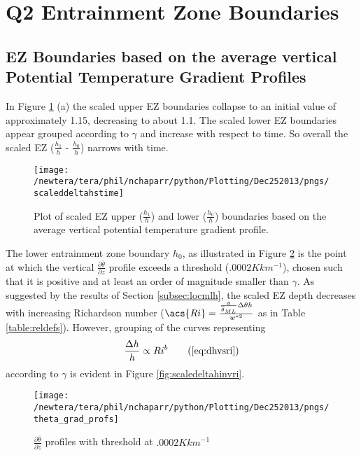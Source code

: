 
\section{Q2 Entrainment Zone Boundaries}
\label{sec:deltahri}
\FloatBarrier
\subsection{\acs{EZ} Boundaries based on the average vertical Potential Temperature Gradient Profiles}
In Figure \ref{fig:scaledEZlims} (a) the scaled upper \acs{EZ} boundaries collapse to an initial value of approximately 1.15, decreasing to about 1.1.  The scaled lower \acs{EZ} boundaries appear grouped according to $\gamma$ and increase with respect to time.  So overall the scaled \acs{EZ} ($\frac{h_{1}}{h}$ - $\frac{h_{0}}{h}$) narrows with time.\\

\begin{figure}[htbp]
    \centering
    \texttt{[image: /newtera/tera/phil/nchaparr/python/Plotting/Dec252013/pngs/scaleddeltahstime]}
    \caption{Plot of scaled \acs{EZ} upper ($\frac{h_{1}}{h}$) and lower ($\frac{h_{0}}{h}$) boundaries based on the average vertical potential temperature gradient profile.}
    \label{fig:scaledEZlims}   %
\end{figure}

The lower entrainment zone boundary $h_{0}$, as illustrated in Figure \ref{fig:thresh} is the point at which the vertical 
$\frac{\partial \overline{\theta}}{\partial z}$ profile exceeds a threshold ($.0002K km^{-1}$), chosen such that
it is positive and at least an order of magnitude smaller than $\gamma$.   
As suggested by the results of Section \ref{subsec:locmlh}, the scaled \acs{EZ} depth decreases with increasing Richardson number ($\acs{Ri} = \frac{\frac{g}{\overline{\theta}_{ML}}\Delta \theta h}{w^{*2}}$ as in Table \ref{table:reldefs}).  However, grouping of the curves representing
\begin{equation}
\frac{\Delta h}{h} \propto Ri ^{b} \tag{\ref{eq:dhvsri}}
\end{equation}
according to $\gamma$ is evident in Figure \ref{fig:scaledeltahinvri}.\\


\begin{figure}[htbp]
    \centering
    \texttt{[image: /newtera/tera/phil/nchaparr/python/Plotting/Dec252013/pngs/theta\_grad\_profs]}
    \caption{$\frac{\partial \overline{\theta}}{\partial z}$ profiles with threshold at $.0002Kkm^{-1}$}
    \label{fig:thresh}   %
\end{figure}

